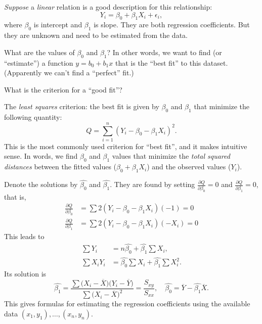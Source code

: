 \documentclass[12pt]{article}
\begin{document}
\emph{Suppose} a \emph{linear} relation is a good description
for this relationship:
\[
Y_i = \beta_0 + \beta_1 X_i + \epsilon_i
,
\]
where $\beta_0$ is intercept
and $\beta_1$ is slope.
They are both regression coefficients.
But they are unknown and need to be estimated from the data.

What are the values of $\beta_0$ and $\beta_1$?
In other words, we want to find (or ``estimate'')
a function $y = b_0 + b_1 x$ that is the ``best fit'' to this dataset.
(Apparently we can't find a ``perfect'' fit.)

What is the criterion for a ``good fit''?

The \emph{least squares} criterion:
the best fit is given by $\beta_0$ and $\beta_1$ that
minimize the following quantity:
\[
Q = \sum_{i=1}^n (Y_i - \beta_0 - \beta_1 X_i)^2.
\]
This is the most commonly used criterion for ``best fit'',
and it makes intuitive sense.
In words, we find $\beta_0$ and $\beta_1$ values that minimize
the \emph{total squared distances}
between the fitted values (\ie $\beta_0 + \beta_1 X_i$)
and the observed values (\ie $Y_i$).

Denote the solutions by $\hat{\beta_0}$ and $\hat{\beta_1}$.
They are found by setting
$\frac{\partial Q}{\partial \beta_0} = 0$ and
$\frac{\partial Q}{\partial \beta_1} = 0$,
that is,
\begin{align}
\frac{\partial Q}{\partial \beta_0}
&= \sum 2(Y_i - \beta_0 - \beta_1X_i)(-1)  = 0\\
\frac{\partial Q}{\partial \beta_1}
&= \sum 2(Y_i - \beta_0 - \beta_1X_i)(-X_i) = 0
\end{align}
This leads to
\begin{equation}\label{eq:normal-eqn}
\begin{split}
\sum Y_i &= n \hat{\beta_0} + \hat{\beta_1} \sum X_i, \\
\sum X_i Y_i &= \hat{\beta_0} \sum X_i + \hat{\beta_1} \sum X_i^2.
\end{split}
\end{equation}
Its solution is
\begin{equation}\label{eq:LS}
\hat{\beta_1}
=
    \frac{\sum \bigl(X_i - \overline{X}\bigr)
        \bigl(Y_i - \overline{Y}\bigr)}
    {\sum \bigl(X_i - \overline{X}\bigr)^2}
= \frac{S_{xy}}{S_{xx}}
,\quad
\hat{\beta_0} = \overline{Y} - \hat{\beta_1} \overline{X}
.
\end{equation}
This gives formulas for estimating the regression coefficients
using the available data $(x_1, y_1),\dotsc, (x_n,y_n)$.
\end{document}
